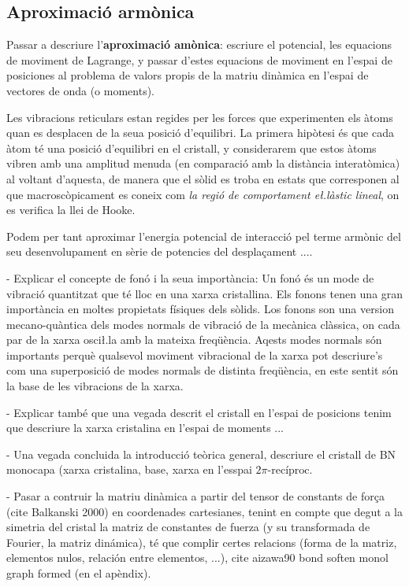 \documentclass[12pt,twoside,a4paper, notitlepage]{article}%
\begin{document}
\subsection{Aproximació armònica}
Passar a descriure l'\textbf{aproximació amònica}: escriure el potencial, les equacions de moviment de Lagrange, y passar d'estes equacions de moviment en l'espai de posiciones al problema de valors propis de la matriu dinàmica en l'espai de vectores de onda (o moments).

Les vibracions reticulars estan regides per les forces que experimenten els àtoms quan es desplacen de la seua posició d'equilibri. La primera hipòtesi és que cada àtom té una posició d'equilibri en el cristall, y considerarem que estos àtoms vibren amb una amplitud menuda (en comparació amb la distància interatòmica) al voltant d'aquesta, de manera que el sòlid es troba en estats que corresponen al que macroscòpicament es coneix com \textit{la regió de comportament e\l.làstic lineal}, on es verifica la llei de Hooke.

Podem per tant aproximar l'energia potencial de interacció pel terme armònic del seu desenvolupament en sèrie de potencies del despla\c{c}ament ....


- Explicar el concepte de fonó i la seua importància: Un fonó és un mode de vibració quantitzat que té lloc en una xarxa cristallina. Els fonons tenen una gran importància en moltes propietats físiques dels sòlids. Los fonons son una version mecano-quàntica dels modes normals de vibració de la mecànica clàssica, on cada par de la xarxa osci\l.la amb la mateixa freqüència. Aqests modes normals són importants perquè qualsevol moviment vibracional de la xarxa pot descriure's com una superposició de modes normals de distinta freqüència, en este sentit són la base de les vibracions de la xarxa.

- Explicar també que una vegada descrit el cristall en l'espai de posicions tenim que descriure la xarxa cristalina en l'espai de moments ...

- Una vegada concluida la introducció teòrica general, descriure el cristall de BN monocapa (xarxa cristalina, base, xarxa en l'esspai $2\pi\text{-recíproc}$.

- Pasar a contruir la matriu dinàmica a partir del tensor de constants de for\c{c}a (cite Balkanski 2000) en coordenades cartesianes, tenint en compte que degut a la simetria del cristal la matriz de constantes de fuerza (y su transformada de Fourier, la matriz dinámica), té que complir certes relacions (forma de la matriz, elementos nulos, relación entre elementos, ...), cite aizawa90 bond soften monol graph formed (en el apèndix). 
\end{document}
